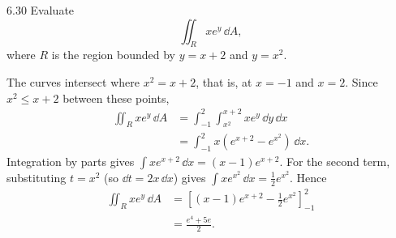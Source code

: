 \documentclass[11pt,oneside]{article}
\begin{document}
\begin{problem}{6.30}
Evaluate
\[
    \iint_R xe^y\,\dd A,
\]
where $R$ is the region bounded by $y=x+2$ and $y=x^2$.
\end{problem}
\begin{solution}
The curves intersect where $x^2=x+2$, that is, at
$x=-1$ and $x=2$. Since $x^2\le x+2$ between these points,
\[
\begin{aligned}
    \iint_R xe^y\,\dd A
    &=\int_{-1}^2\int_{x^2}^{x+2}xe^y\,\dd y\,\dd x\\
    &=\int_{-1}^2x\left(e^{x+2}-e^{x^2}\right)\,\dd x.
\end{aligned}
\]
Integration by parts gives $\int xe^{x+2}\,\dd x=(x-1)e^{x+2}$.
For the second term, substituting $t=x^2$ (so $\dd t=2x\,\dd x$)
gives $\int xe^{x^2}\,\dd x=\frac12e^{x^2}$. Hence
\[
\begin{aligned}
    \iint_R xe^y\,\dd A
    &=\left[(x-1)e^{x+2}-\frac12e^{x^2}\right]_{-1}^2\\
    &=\boxed{\frac{e^4+5e}{2}}.
\end{aligned}
\]
\end{solution}
\end{document}
